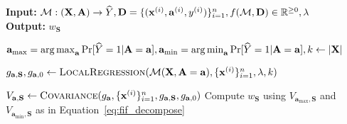 \begin{algorithm}
	\caption{{\fairXplainer}}\label{algo:framework}
	\hspace*{\algorithmicindent} \textbf{Input:} $ \mathcal{M}: (\mathbf{X}, \mathbf{A}) \rightarrow \widehat{Y},  \mathbf{D} = \{(\mathbf{x}^{(i)}, \mathbf{a}^{(i)}, y^{(i)})\}_{i=1}^n, f(\mathcal{M}, \mathbf{D}) \in \mathbb{R}^{\geq 0}, \lambda $  \\
	\hspace*{\algorithmicindent} \textbf{Output:} $ w_{\mathbf{S}}$ 
	\begin{algorithmic}[1]
		\State $ \mathbf{a}_{\max} = \operatorname*{arg\,max}_{\mathbf{a}} \Pr[\widehat{Y} = 1 | \mathbf{A} = \mathbf{a}], \mathbf{a}_{\min} = \operatorname*{arg\,min}_{\mathbf{a}} \Pr[\widehat{Y} = 1 | \mathbf{A} = \mathbf{a}], k \gets    |\mathbf{X}| $
		\label{algo_line:fif_computation_start}
		
		 
		\State $ g_{\mathbf{a}, \mathbf{S}},g_{\mathbf{a}, 0} \gets \textsc{LocalRegression}(\mathcal{M}(\mathbf{X}, \mathbf{A} = \mathbf{a}), \{\mathbf{x}^{(i)}\}_{i=1}^n, \lambda, k) $
		
		\State $ V_{\mathbf{a}, \mathbf{S}} \gets \textsc{Covariance}(g_{\mathbf{a}},  \{\mathbf{x}^{(i)}\}_{i=1}^n, g_{\mathbf{a}, \mathbf{S}},g_{\mathbf{a}, 0}) $
		\EndFor
		\State Compute $ w_{\mathbf{S}}$ using  $V_{\mathbf{a}_{\max},\mathbf{S}}$ and $V_{\mathbf{a}_{\min},\mathbf{S}}$ as in Equation~\eqref{eq:fif_decompose}
		\label{algo_line:fif_computation_end}
		

\end{algorithmic}
\end{algorithm}
